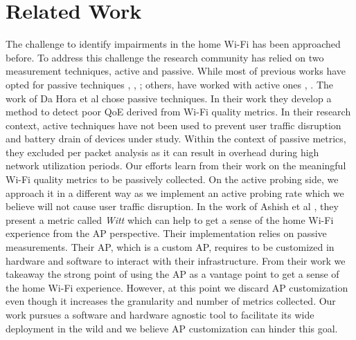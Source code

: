 \section{Related Work}\label{Back_Related_Work}

The challenge to identify impairments in the home Wi-Fi has been approached before. To address this challenge the research community has relied on two measurement techniques, active and passive. While most of previous works have opted for passive techniques \cite{hostview}, \cite{passive_wifi_capacity_estimation}, \cite{observing_through_wifi_APs}; others, have worked with active ones \cite{can_user_level_probing}, \cite{WLAN_Troubleshooting}. The work of Da Hora et al \cite{passive_wifi_capacity_estimation} chose passive techniques. In their work they develop  a method to detect poor QoE derived from Wi-Fi quality metrics. In their research context, active techniques have not been used to prevent user traffic disruption and battery drain of devices under study. Within the context of passive metrics, they excluded per packet analysis as it can result in overhead during high network utilization periods. Our efforts learn from their work on the meaningful Wi-Fi quality metrics to be passively collected. On the active probing side, we approach it in a different way as we implement an active probing rate which we believe will not cause user traffic disruption. In the work of Ashish et al \cite{observing_through_wifi_APs}, they present a metric called \emph{Witt} which can help to get a sense of the home Wi-Fi experience from the AP perspective. Their implementation relies on passive measurements. Their AP, which is a custom AP, requires to be customized in hardware and software to interact with their infrastructure. From their work we takeaway the strong point of using the AP as a vantage point to get a sense of the home Wi-Fi experience. However, at this point we discard AP customization even though it increases the granularity and number of metrics collected. Our work pursues a software and hardware agnostic tool to facilitate its wide deployment in the wild and we believe AP customization can hinder this goal.
